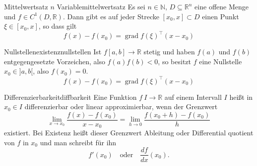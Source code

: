 \begin{Theorem}{Mittelwertsatz $n$ Variable}{mittelwertsatz}
    Es sei $n\in\mathbb{N}$, $D\subseteq\mathbb{R}^n$ eine offene Menge und $f\in C^{1}(D,\mathbb{R})$. Dann gibt es auf jeder Strecke $[x_0,x]\subset D$ einen Punkt $\xi\in[x_0,x]$, so dass gilt
    \begin{equation*}
        f(x)-f(x_0) = \operatorname{grad} f(\xi)^{\top}(x-x_0)
    \end{equation*}
\end{Theorem}
\begin{Corollary}{Nullstellenexistenz}{nullstellen}
Ist $f[a,b]\to\mathbb{R}$ stetig und haben $f(a)$ und $f(b)$ entgegengesetzte
Vorzeichen, also $f(a)f(b)<0$, so besitzt $f$ eine Nullstelle $x_0\in]a,b[$,
also $f(x_0)=0$.
    \begin{equation*}
        f(x)-f(x_0) = \operatorname{grad} f(\xi)^{\top}(x-x_0)
    \end{equation*}
\end{Corollary}
\begin{Definition}{Differenzierbarkeit}{diffbarkeit}
    Eine Funktion $f~I\to\mathbb{R}$ auf einem Intervall $I$ hei\ss{}t in $x_0\in I$ differenzierbar oder linear approximierbar, wenn der Grenzwert
    \begin{equation*}
        \lim\limits_{x\to x_0}\frac{f(x)-f(x_0)}{x-x_0}=
        \lim\limits_{h\to 0}\frac{f(x_0+h)-f(x_0)}{h}
    \end{equation*}
    existiert. Bei Existenz hei\ss{}t dieser Grenzwert Ableitung oder Differential quotient von $f$ in $x_0$ und man schreibt f\"{u}r ihn
    \begin{equation*}
        f'(x_0)\quad\text{oder}\quad\frac{df}{dx}(x_0).
    \end{equation*}
\end{Definition}
